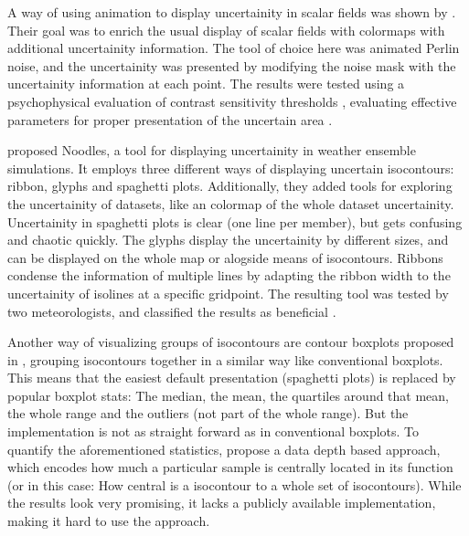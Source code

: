 A way of using animation to display uncertainity in scalar fields was shown by \citeauthor{coninx_visualization_2011}. 
Their goal was to enrich the usual display of scalar fields with colormaps with additional uncertainity information. 
The tool of choice here was animated Perlin noise, and the uncertainity was presented by modifying the noise mask with the uncertainity information at each point. 
The results were tested using a psychophysical evaluation of contrast sensitivity thresholds \cite{coninx_visualization_2011}, evaluating effective parameters for proper presentation of the uncertain area \cite{coninx_visualization_2011}.

\citeauthor{sanyal_noodles_2010} proposed Noodles, a tool for displaying uncertainity in weather ensemble simulations. 
It employs three different ways of displaying uncertain isocontours: ribbon, glyphs and spaghetti plots. 
Additionally, they added tools for exploring the uncertainity of datasets, like an colormap of the whole dataset uncertainity.  
Uncertainity in spaghetti plots is clear (one line per member), but gets confusing and chaotic quickly. 
The glyphs display the uncertainity by different sizes,  and can be displayed on the whole map or alogside means of isocontours. 
Ribbons condense the information of multiple lines by adapting the ribbon width to the uncertainity of isolines at a specific gridpoint. 
The resulting tool was tested by two meteorologists, and classified the results as beneficial \cite{sanyal_noodles_2010}.  


Another way of visualizing groups of isocontours are contour boxplots proposed in \cite{whitaker_contour_2013}, grouping isocontours together in a similar way like conventional boxplots. 
This means that the easiest default presentation (spaghetti plots) is replaced by popular boxplot stats: The median, the mean, the quartiles around that mean, the whole range and the outliers (not part of the whole range). 
But the implementation is not as straight forward as in conventional boxplots. 
To quantify the aforementioned statistics, \citeauthor{whitaker_contour_2013} propose a data depth based approach, which encodes how much a particular sample is centrally located in its function (or in this case: How central is a isocontour to a whole set of isocontours). 
While the results look very promising, it lacks a publicly available implementation, making it hard to use the approach.

%
%
%
%


